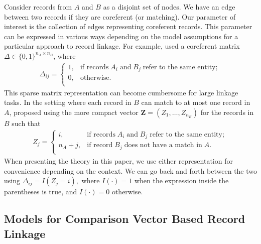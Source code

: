 \documentclass[12pt,letterpaper]{article}
\newcommand{\1}[1]{\mathbb{I}\!\left[#1\right]} %
\begin{document}
Consider records from $A$ and $B$ as a disjoint set of nodes. We have an edge between two records if they are coreferent (or matching). Our parameter of interest is the collection of edges representing coreferent records. This parameter can be expressed in various ways depending on the model assumptions for a particular approach to record linkage. For example, \cite{fellegi_theory_1969} used a coreferent matrix $\Delta \in \{0, 1\}^{n_A \times n_B}$, where
\begin{align}\label{eqn:delta-notation}
	\Delta_{ij} =
	\begin{cases}
		1, & \text{if records}\;  A_i \; \text{and}\; B_j \; \text{refer to the same entity}; \\
		0, & \text{otherwise}.\\
	\end{cases}
\end{align}
This sparse matrix representation can become cumbersome for large linkage tasks. In the setting where each record in $B$ can match to at most one record in $A$, \cite{sadinle_bayesian_2017} proposed using the more compact vector $\bm{Z} = (Z_1, \ldots, Z_{n_B})$ for the records in $B$ such that
\begin{align}\label{eqn:z-notation}
	Z_{j} =
	\begin{cases}
		i, & \text{if records}\;  A_i \; \text{and}\; B_j  \; \text{refer to the same entity}; \\
		n_A + j, & \text{if record}\;  B_j \; \text{does not have a match in}\; A. \\
	\end{cases}
\end{align}
When presenting the theory in this paper, we use either representation for convenience depending on the context. We can go back and forth between the two using $\Delta_{ij} = I(Z_j = i),$ where $I(\cdot) = 1$ when the expression inside the parentheses is true, and $I(\cdot) = 0$ otherwise.

\subsection{Models for Comparison Vector Based Record Linkage}\label{sec:model-review}
\end{document}
